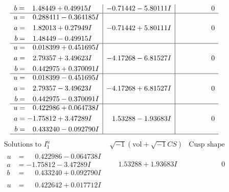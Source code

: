 \documentclass[1p]{elsarticle_modified}
\theoremstyle{definition}
\newcommand{\I}{\sqrt{-1}}
\begin{document}
$$\begin{array}{c|c|c}
\begin{aligned}
b &= \phantom{-}1.48449 + 0.49915 I\end{aligned}
 & -0.71442 - 5.80111 I & \phantom{-0.000000 } 0 \\ \hline\begin{aligned}
u &= \phantom{-}0.288411 - 0.364185 I \\
a &= \phantom{-}1.82013 + 0.27949 I \\
b &= \phantom{-}1.48449 - 0.49915 I\end{aligned}
 & -0.71442 + 5.80111 I & \phantom{-0.000000 } 0 \\ \hline\begin{aligned}
u &= \phantom{-}0.018399 + 0.451695 I \\
a &= \phantom{-}2.79357 + 3.49623 I \\
b &= \phantom{-}0.442975 + 0.370091 I\end{aligned}
 & -4.17268 - 6.81527 I & \phantom{-0.000000 } 0 \\ \hline\begin{aligned}
u &= \phantom{-}0.018399 - 0.451695 I \\
a &= \phantom{-}2.79357 - 3.49623 I \\
b &= \phantom{-}0.442975 - 0.370091 I\end{aligned}
 & -4.17268 + 6.81527 I & \phantom{-0.000000 } 0 \\ \hline\begin{aligned}
u &= \phantom{-}0.422986 + 0.064738 I \\
a &= -1.75812 + 3.47289 I \\
b &= \phantom{-}0.433240 - 0.092790 I\end{aligned}
 & \phantom{-}1.53288 - 1.93683 I & \phantom{-0.000000 } 0\\
 \hline 
 \end{array}$$\newpage$$\begin{array}{c|c|c}  
\text{Solutions to }I^u_{1}& \I (\text{vol} + \sqrt{-1}CS) & \text{Cusp shape}\\
 \hline 
\begin{aligned}
u &= \phantom{-}0.422986 - 0.064738 I \\
a &= -1.75812 - 3.47289 I \\
b &= \phantom{-}0.433240 + 0.092790 I\end{aligned}
 & \phantom{-}1.53288 + 1.93683 I & \phantom{-0.000000 } 0 \\ \hline\begin{aligned}
u &= \phantom{-}0.422642 + 0.017712 I \\

\end{aligned}
\end{array}$$
\end{document}
